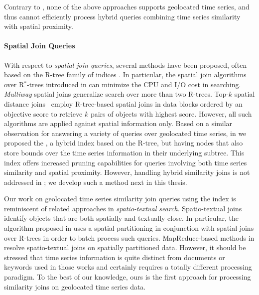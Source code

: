 Contrary to \btsr, none of the above approaches supports geolocated time series, and thus cannot efficiently process hybrid queries combining time series similarity with spatial proximity.

\paragraph{Spatial Join Queries} With respect to {\em spatial join queries}, several methods have been proposed, often based on the R-tree family of indices \cite{Guttman1984, Beckmann1990}. In particular, the spatial join algorithms over R$^*$-trees introduced in \cite{DBLP:conf/sigmod/BrinkhoffKS93} can minimize the CPU and I/O cost in searching. {\em Multiway} spatial joins \cite{papadias1999processing} generalize search over more than two R-trees. Top-$k$ spatial distance joins~\cite{qi2013efficient} employ R-tree-based spatial joins in data blocks ordered by an objective score to retrieve $k$ pairs of objects with highest score. However, all such algorithms are applied against spatial information only. Based on a similar observation for answering a variety of queries over geolocated time series, in \cite{chatzig17btsr} we proposed the \btsr, a hybrid index based on the R-tree, but having nodes that also store bounds over the time series information in their underlying subtree. This index offers increased pruning capabilities for queries involving both time series similarity and spatial proximity. However, handling hybrid similarity joins is not addressed in \cite{chatzig17btsr}; we develop such a method next in this thesis.

Our work on geolocated time series similarity join queries using the \btsr index is reminiscent of related approaches in {\em spatio-textual search}. Spatio-textual joins identify objects that are both spatially and textually close. In particular, the algorithm proposed in \cite{Bouros:2012:SSJ:2428536.2428537} uses a spatial partitioning in conjunction with spatial joins over R-trees in order to batch process such queries. MapReduce-based methods in \cite{Zhang:2014:ESS:2682647.2682773} resolve spatio-textual joins on spatially partitioned data. However, it should be stressed that time series information is quite distinct from documents or keywords used in those works and certainly requires a totally different processing paradigm. To the best of our knowledge, ours is the first approach for processing similarity joins on geolocated time series data.

